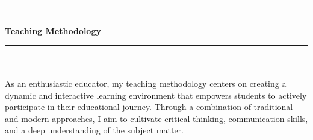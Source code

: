 
 \phantom \quad \\
   \newpage
    \thispagestyle{empty}
\hrule \phantom \quad  \vspace*{1\baselineskip}  \\
 {\bf Teaching Methodology}
 \vspace*{1\baselineskip}  \hrule \phantom \quad \\
\vspace*{3\baselineskip} \phantom \quad \\
 \mdseries \normalsize
As an enthusiastic educator, my teaching methodology centers on creating a dynamic and interactive learning environment that empowers students to actively participate in their educational journey. Through a combination of traditional and modern  approaches, I aim to cultivate critical thinking, communication skills, and a deep understanding of the subject matter.
